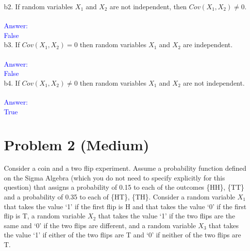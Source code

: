 \documentclass[letterpaper, 11pt]{article}
\begin{document}
\begin{itemize}
b2. If random variables $X_1$ and $X_2$ are not independent, then $Cov(X_1,X_2) \neq 0$.\\
\\
\textcolor{blue}{Answer:\\ False}\\

b3. If $Cov(X_1,X_2) = 0$ then random variables $X_1$ and $X_2$ are independent.\\
\\
\textcolor{blue}{Answer:\\ False}\\


b4. If $Cov(X_1,X_2) \neq 0$ then random variables $X_1$ and $X_2$ are not independent.\\
\\
\textcolor{blue}{Answer:\\ True}\\

\end{itemize}

\section*{Problem 2 (Medium)}

Consider a coin and a two flip experiment.  Assume a probability function defined on the Sigma Algebra (which you do not need to specify explicitly for this question) that assigns a probability of 0.15 to each of the outcomes \{HH\}, \{TT\} and a probability of 0.35 to each of \{HT\}, \{TH\}.  Consider a random variable $X_1$ that takes the value `1' if the first flip is H and that takes the value `0' if the first flip is T, a random variable $X_2$ that takes the value `1'  if the two flips are the same and `0' if the two flips are different, and a random variable $X_3$ that takes the value `1'  if either of the two flips are T and `0' if neither of the two flips are T. 
\end{document}
